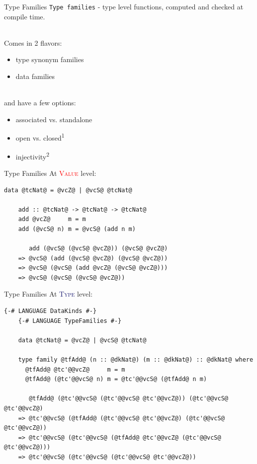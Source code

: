 \documentclass[xcolor={usenames,dvipsnames}]{beamer}
\newcommand{\htycon}[1]{\textcolor{MidnightBlue}{\textsc{#1}}}
\newcommand{\hvalcon}[1]{\textcolor{Red}{\textsc{#1}}}
\begin{document}
\begin{frame}[fragile]{Type Families}
  \texttt{Type families} - type level functions, computed and checked at compile time.

  \ \\
  Comes in 2 flavors:
  \begin{itemize}
    \item type synonym families
    \item data families
  \end{itemize}

  \ \\
  and have a few options:
  \begin{itemize}
    \item associated vs. standalone
    \item open vs. closed\textsuperscript{1}
    \item injectivity\textsuperscript{2}
  \end{itemize}
\end{frame}

\begin{frame}[fragile]{Type Families}
  At \hvalcon{Value} level:
  \begin{lstlisting}[style=hask]
    data @tcNat@ = @vcZ@ | @vcS@ @tcNat@

    add :: @tcNat@ -> @tcNat@ -> @tcNat@
    add @vcZ@     m = m
    add (@vcS@ n) m = @vcS@ (add n m)

       add (@vcS@ (@vcS@ @vcZ@)) (@vcS@ @vcZ@)
    => @vcS@ (add (@vcS@ @vcZ@) (@vcS@ @vcZ@))
    => @vcS@ (@vcS@ (add @vcZ@ (@vcS@ @vcZ@)))
    => @vcS@ (@vcS@ (@vcS@ @vcZ@))
  \end{lstlisting}
\end{frame}

\begin{frame}[fragile]{Type Families}
  At \htycon{Type} level:
  \begin{lstlisting}[style=hask]
    {-# LANGUAGE DataKinds #-}
    {-# LANGUAGE TypeFamilies #-}

    data @tcNat@ = @vcZ@ | @vcS@ @tcNat@

    type family @tfAdd@ (n :: @dkNat@) (m :: @dkNat@) :: @dkNat@ where
      @tfAdd@ @tc'@@vcZ@     m = m
      @tfAdd@ (@tc'@@vcS@ n) m = @tc'@@vcS@ (@tfAdd@ n m)

       @tfAdd@ (@tc'@@vcS@ (@tc'@@vcS@ @tc'@@vcZ@)) (@tc'@@vcS@ @tc'@@vcZ@)
    => @tc'@@vcS@ (@tfAdd@ (@tc'@@vcS@ @tc'@@vcZ@) (@tc'@@vcS@ @tc'@@vcZ@))
    => @tc'@@vcS@ (@tc'@@vcS@ (@tfAdd@ @tc'@@vcZ@ (@tc'@@vcS@ @tc'@@vcZ@)))
    => @tc'@@vcS@ (@tc'@@vcS@ (@tc'@@vcS@ @tc'@@vcZ@))
  \end{lstlisting}
\end{frame}
\end{document}
